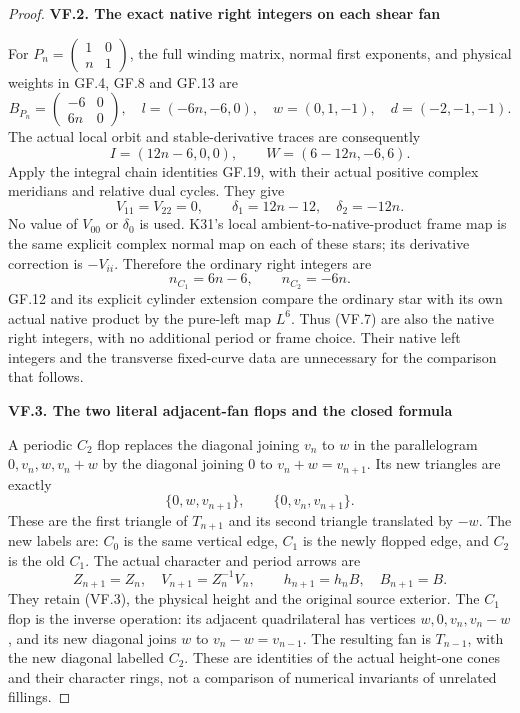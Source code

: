 \begin{proof}
\par

\medskip\noindent\textbf{VF.2. The exact native right integers on each shear fan}

\par\nobreak

For \(P_n=\begin{pmatrix}1&0\\n&1\end{pmatrix}\), the full
winding matrix, normal first exponents, and physical weights in
GF.4, GF.8 and GF.13 are
\[
 B_{P_n}=\begin{pmatrix}-6&0\\6n&0\end{pmatrix},\quad
 l=(-6n,-6,0),\quad
 w=(0,1,-1),\quad d=(-2,-1,-1).                       \tag{VF.4}
\]
The actual local orbit and stable-derivative traces are consequently
\[
 I=(12n-6,0,0),\qquad W=(6-12n,-6,6).                 \tag{VF.5}
\]
Apply the integral chain identities GF.19, with their actual
positive complex meridians and relative dual cycles. They give
\[
 V_{11}=V_{22}=0,\qquad
             \delta_1=12n-12,\quad\delta_2=-12n.      \tag{VF.6}
\]
No value of \(V_{00}\) or \(\delta_0\) is used. K31's local
ambient-to-native-product frame map is the same explicit complex
normal map on each of these stars; its derivative correction is
\(-V_{ii}\). Therefore the ordinary right integers are
\[
              n_{C_1}=6n-6,\qquad n_{C_2}=-6n.         \tag{VF.7}
\]
GF.12 and its explicit cylinder extension compare the ordinary
star with its own actual native product by the pure-left map
\(L^6\). Thus (VF.7) are also the native right integers, with no
additional period or frame choice. Their native left integers and
the transverse fixed-curve data are unnecessary for the comparison
that follows.

\par

\medskip\noindent\textbf{VF.3. The two literal adjacent-fan flops and the closed formula}

\par\nobreak

A periodic \(C_2\) flop replaces the diagonal joining \(v_n\) to
\(w\) in the parallelogram \(0,v_n,w,v_n+w\) by the diagonal
joining \(0\) to \(v_n+w=v_{n+1}\). Its new triangles are exactly
\[
 \{0,w,v_{n+1}\},\qquad\{0,v_n,v_{n+1}\}.
\]
These are the first triangle of \(T_{n+1}\) and its second triangle
translated by \(-w\). The new labels are: \(C_0\) is the same
vertical edge, \(C_1\) is the newly flopped edge, and \(C_2\) is
the old \(C_1\). The actual character and period arrows are
\[
 Z_{n+1}=Z_n,\quad V_{n+1}=Z_n^{-1}V_n,\qquad
 h_{n+1}=h_nB,\quad B_{n+1}=B.                        \tag{VF.8}
\]
They retain (VF.3), the physical height and the original source
exterior. The \(C_1\) flop is the inverse operation: its adjacent
quadrilateral has vertices \(w,0,v_n,v_n-w\), and its new diagonal
joins \(w\) to \(v_n-w=v_{n-1}\). The resulting fan is \(T_{n-1}\),
with the new diagonal labelled \(C_2\). These are identities of the
actual height-one cones and their character rings, not a comparison
of numerical invariants of unrelated fillings.


\end{proof}
